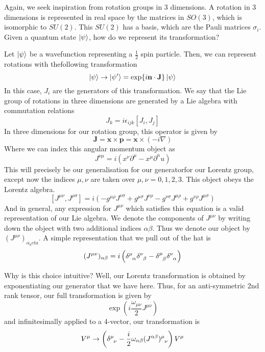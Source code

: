 Again, we seek inspiration from rotation groups in 3 dimensions. A rotation in 3 dimensions is represented in real space by the matrices in $SO(3)$, which is isomorphic to $SU(2)$. This $SU(2)$ has a basis, which are the Pauli matrices $\sigma_i$. Given a quantum state $\ket{\psi}$, how do we represent its transformation?

Let $\ket{\psi}$ be a wavefunction representing a $\frac{1}{2}$ spin particle. Then, we can represent rotations with thefollowing transformation \[ \ket{\psi} \rightarrow \ket{\psi '}  = \exp{i \mathbf{n} \cdot \mathbf{J}} \ket{\psi} \]
In this case, $J_i$ are the generators of this transformation. We say that the Lie group of rotations in three dimensions are generated by a Lie algebra with commutation relations 
\[ J_k  = i \epsilon_{ijk} [J_i, J_j] \]   
In three dimensions for our rotation group, this operator is given by 
\[ \mathbf{J}  = \mathbf{x} \times \mathbf{p} = \mathbf{x} \times ( - i \nabla) \] 
Where we can index this angular momentum object as 
\[ J^{\nu \mu} = i (x^{\nu} \partial^\mu  - x^\mu \partial^nu) \]
This will precisely be our generalisation for our generatorfor our Lorentz group, except now the indices $\mu, \nu$ are taken over $\mu, \nu = 0, 1, 2, 3$. This object obeys the Lorentz algebra.
\[ [J^{\mu \nu}, J^{\rho \sigma}] = i( - g^{\mu \rho} J^{\nu \sigma} + g^{\mu \sigma}J^{\nu \rho}  - g^{\nu \sigma}J^{\mu \rho} + g^{\nu \rho}J^{\mu \sigma}) \]
And in general, any expression for $J^{\mu \nu}$ which satisfies this equation is a valid representation of our Lie algebra. We denote the components of $J^{\mu \nu}$ by writing down the object with two additional indices $\alpha \beta$. Thus we denote our object by $(J^{\mu \nu})_{\alpha_beta}$. A simple representation that we pull out of the hat is \[ (J^{\mu \nu})_{\alpha \beta} = i \left( \delta\indices{^\mu_\alpha} \delta\indices{^\nu_\beta}  - \delta\indices{^\mu_\beta}\delta\indices{^\nu_\alpha} \right) \] 

Why is this choice intuitive? Well, our Lorentz transformation is obtained by exponentiating our generator that we have here. Thus, for an anti-symmetric 2nd rank tensor, our full transformation is given by 
\[ 
\exp(i \frac{\omega_{\mu \nu}}{2} J^{\mu \nu})
\]
and infinitesimally applied to a 4-vector, our transformation is \[ V^\mu \rightarrow \left( \delta\indices{^\mu_\nu} - \frac{i}{2} \omega_{\alpha\beta}(J^{\alpha\beta})\indices{^\mu_\nu} \right) V^\mu \]

